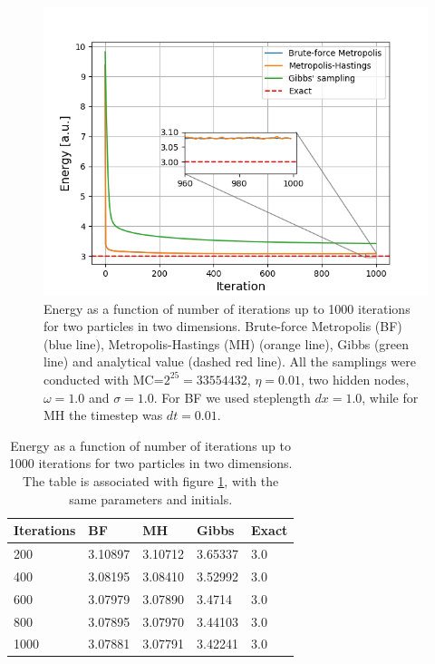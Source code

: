 \documentclass[norsk,a4paper,12pt]{article}
\begin{document}
 \begin{figure} [H]
 	\centering
 	\includegraphics[scale=0.8]{plots/comparison_energy_2P.png}
 	\caption{Energy as a function of number of iterations up to 1000 iterations for two particles in two dimensions. Brute-force Metropolis (BF) (blue line), Metropolis-Hastings (MH) (orange line), Gibbs (green line) and analytical value (dashed red line). All the samplings were conducted with MC=$2^{25}=33 554 432$, $\eta=0.01$, two hidden nodes, $\omega=1.0$ and $\sigma=1.0$. For BF we used steplength $dx=1.0$, while for MH the timestep was $dt=0.01$.}
 	\label{fig:energy2P2D}
 \end{figure}

\begin{table} [H]
	\caption{Energy as a function of number of iterations up to 1000 iterations for two particles in two dimensions. The table is associated with figure \ref{fig:energy2P2D}, with the same parameters and initials. \vspace{2mm}}
	\begin{tabularx}{\textwidth}{X|XXXX} \hline\hline
		\label{tab:energies2P2D}
		Iterations & BF & MH & Gibbs & Exact \\ \hline
				200 & 3.10897 & 3.10712 & 3.65337 & 3.0 \\
				400 & 3.08195 & 3.08410 & 3.52992 & 3.0 \\
				600 & 3.07979 & 3.07890 & 3.4714 & 3.0 \\
				800 & 3.07895 & 3.07970 & 3.44103 & 3.0 \\
				1000 & 3.07881 & 3.07791 & 3.42241 & 3.0 \\ \hline
	\end{tabularx}
\end{table}
\end{document}
